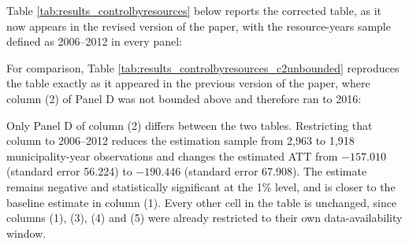 Table \ref{tab:results_controlbyresources} below reports the corrected table, as it now appears in the revised version of the paper, with the resource-years sample defined as 2006--2012 in every panel:



For comparison, Table \ref{tab:results_controlbyresources_c2unbounded} reproduces the table exactly as it appeared in the previous version of the paper, where column (2) of Panel D was not bounded above and therefore ran to 2016:



Only Panel D of column (2) differs between the two tables. Restricting that column to 2006--2012 reduces the estimation sample from 2,963 to 1,918 municipality-year observations and changes the estimated ATT from $-157.010$ (standard error 56.224) to $-190.446$ (standard error 67.908). The estimate remains negative and statistically significant at the 1\% level, and is closer to the baseline estimate in column (1). Every other cell in the table is unchanged, since columns (1), (3), (4) and (5) were already restricted to their own data-availability window.



